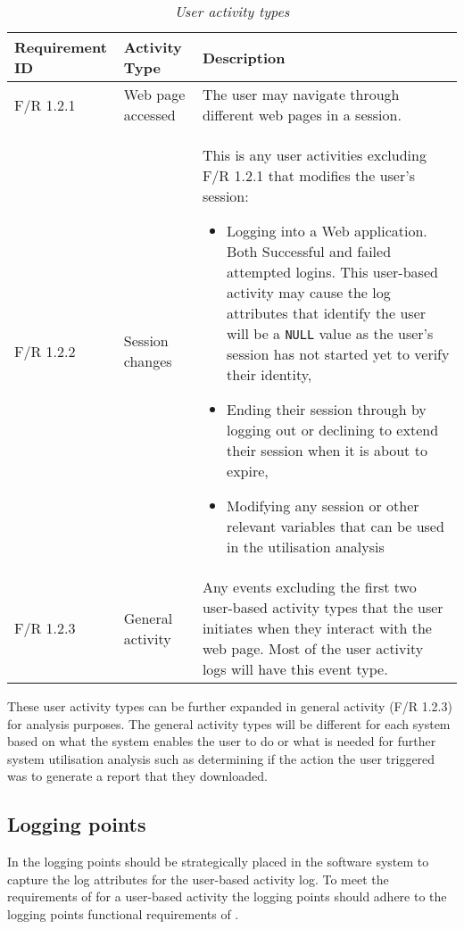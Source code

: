 \begin{table}[!htb]
	\centering
	\caption[User activity types]
	{\textit{User activity types}}
	\label{tbl:ch2_userActivityTypes}
	\begin{tabularx}{\textwidth}{|l|l|X|}
		\hline \textbf{Requirement ID} & \textbf{Activity Type} & \textbf{Description} \\
		\hline F/R 1.2.1 & Web page accessed & The user may navigate through different web pages in a session.\\
		\hline F/R 1.2.2 & Session changes & This is any user activities excluding F/R 1.2.1 that modifies the user's session:
		\begin{itemize}
			\item Logging into a Web application. Both Successful and failed attempted logins. This user-based activity may cause the log attributes that identify the user will be a \texttt{NULL} value as the user's session has not started yet to verify their identity,
			\item Ending their session through by logging out or declining to extend their session when it is about to expire,
			\item Modifying any session or other relevant variables that can be used in the utilisation analysis
		\end{itemize}\\
		\hline F/R 1.2.3 & General activity & Any events excluding the first two user-based activity types that the user initiates when they interact with the web page. Most of the user activity logs will
		have this event type.\\ 
		\hline
	\end{tabularx}
\end{table}

These user activity types can be further expanded in general activity (F/R 1.2.3) for analysis purposes. The general activity types will be different for each system based on what the system enables the user to do or what is needed for further system utilisation analysis such as determining if the action the user triggered was to generate a report that they downloaded.

\clearpage

\subsection{Logging points}\label{sec:ch2_loggingPoints}
In  the logging points should be strategically placed in the software system to capture the log attributes for the user-based activity log. To meet the requirements of  for a user-based activity the logging points should adhere to the logging points functional requirements of .

